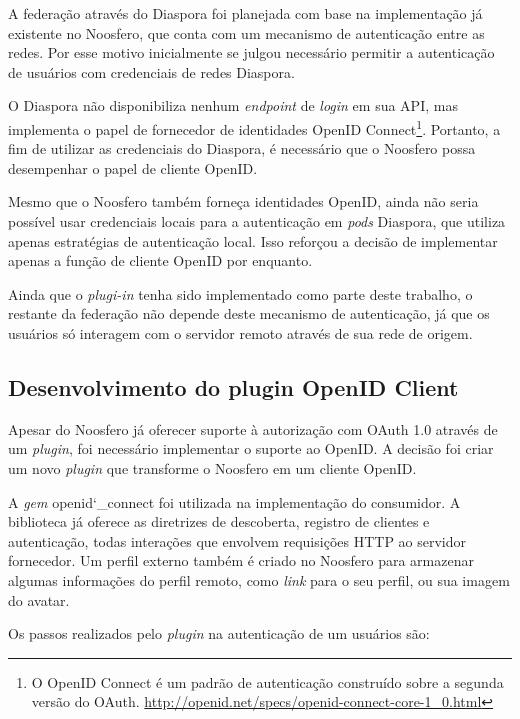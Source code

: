 A federação através do Diaspora foi planejada com base na implementação já existente
no Noosfero, que conta com um mecanismo de autenticação entre as redes. Por esse
motivo inicialmente se julgou necessário permitir a autenticação de usuários com
credenciais de redes Diaspora.

O Diaspora não disponibiliza nenhum \textit{endpoint} de \textit{login} em sua API,
mas implementa o papel de fornecedor de identidades OpenID Connect\footnote{O OpenID
Connect é um padrão de autenticação construído sobre a segunda versão do OAuth.
\url{http://openid.net/specs/openid-connect-core-1_0.html}}. Portanto, a fim de
utilizar as credenciais do Diaspora, é necessário que o Noosfero possa desempenhar o
papel de cliente OpenID.

Mesmo que o Noosfero também forneça identidades OpenID, ainda não seria possível
usar credenciais locais para a autenticação em \textit{pods} Diaspora, que utiliza
apenas estratégias de autenticação local. Isso reforçou a decisão de implementar
apenas a função de cliente OpenID por enquanto.

Ainda que o \textit{plugi-in} tenha sido implementado como parte deste trabalho, o
restante da federação não depende deste mecanismo de autenticação, já que os
usuários só interagem com o servidor remoto através de sua rede de origem.

\subsection{Desenvolvimento do plugin OpenID Client}

Apesar do Noosfero já oferecer suporte à autorização com OAuth 1.0 através de um
\textit{plugin}, foi necessário implementar o suporte ao OpenID. A decisão foi criar
um novo \textit{plugin} que transforme o Noosfero em um cliente OpenID.

A \textit{gem} openid\char`_connect foi utilizada na implementação do consumidor. A
biblioteca já oferece as diretrizes de descoberta, registro de clientes e
autenticação, todas interações que envolvem requisições HTTP ao servidor fornecedor.
Um perfil externo também é criado no Noosfero para armazenar algumas informações do
perfil remoto, como \textit{link} para o seu perfil, ou sua imagem do avatar.

Os passos realizados pelo \textit{plugin} na autenticação de um usuários são:


